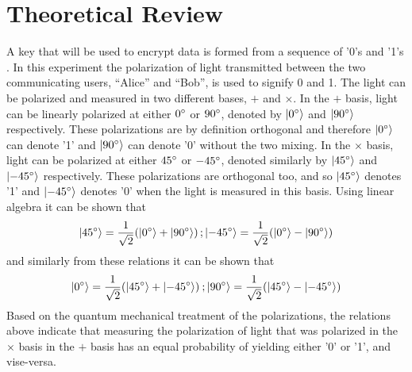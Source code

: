 \documentclass[reprint,amsmath,amssymb,aps, prl,superscriptaddress]{revtex4-2}
\begin{document}
\section*{Theoretical Review}

A key that will  be used to encrypt data is formed from a sequence of '0's and '1's . In this experiment the polarization of light transmitted between the two communicating users, ``Alice'' and ``Bob'', is used to signify 0 and 1. The light can be polarized and measured in two different bases, $+$ and $\times$. In the $+$ basis, light can be linearly polarized at either $0^{\circ}$ or $90^{\circ}$, denoted by $\ket{0^{\circ}}$ and $\ket{90^{\circ}}$ respectively. These polarizations are by definition orthogonal  and therefore $\ket{0^{\circ}}$ can denote '1' and $\ket{90^{\circ}}$ can denote '0' without the two mixing. In the $\times$ basis, light can be polarized at either $45^{\circ}$ or $-45^{\circ}$, denoted similarly by $\ket{45^{\circ}}$ and $\ket{-45^{\circ}}$ respectively. These polarizations are orthogonal too, and so $\ket{45^{\circ}}$ denotes '1' and $\ket{-45^{\circ}}$ denotes '0' when the light is measured in this basis. Using linear algebra it can be shown that
\begin{equation}
\ket{45^{\circ}}=\frac{1}{\sqrt{2}}(\ket{0^{\circ}}+\ket{90^{\circ}})\,;\ket{-45^{\circ}}=\frac{1}{\sqrt{2}}(\ket{0^{\circ}}-\ket{90^{\circ}})\label{eq: Relation between X basis to + basis}
\end{equation}
 and similarly from these relations it can be shown that 
\begin{equation}
\ket{0^{\circ}}=\frac{1}{\sqrt{2}}(\ket{45^{\circ}}+\ket{-45^{\circ}})\:;\ket{90^{\circ}}=\frac{1}{\sqrt{2}}(\ket{45^{\circ}}-\ket{-45^{\circ}})\label{eq: Relation between + basis to X basis}
\end{equation}
Based on the quantum mechanical treatment of the polarizations, the
relations above indicate that measuring the polarization of light
that was polarized in the $\times$ basis in the $+$ basis has an
equal probability of yielding either '0' or '1', and vise-versa.
\end{document}
